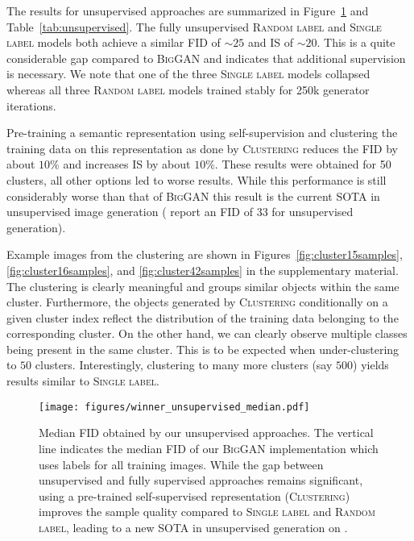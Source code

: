 \documentclass{article}
\newcommand{\tranC}{\textsc{Clustering}}
\newcommand{\slabels}{\textsc{Single label}}
\newcommand{\rlabels}{\textsc{Random label}}
\newcommand{\biggan}{\textsc{BigGAN}}
\begin{document}
The results for unsupervised approaches are summarized in Figure~\ref{fig:unsupervised} and Table~\ref{tab:unsupervised}. The fully unsupervised \rlabels{} and \slabels{} models both achieve a similar FID of $\sim25$ and IS of $\sim20$. This is a quite considerable gap compared to \biggan{} and indicates that additional supervision is necessary. We note that one of the three \slabels{} models collapsed whereas all three \rlabels{} models trained stably for 250k generator iterations.

Pre-training a semantic representation using self-supervision and clustering the training data on this representation as done by \tranC{} 
reduces the FID by about $10\%$ and increases IS by about $10\%$. These results were obtained for 50 clusters, all other options led to worse results. While this performance is still considerably worse than that of \biggan{} this result is the current SOTA in unsupervised image generation (\citet{chen2019self} report an FID of 33 for unsupervised generation).

Example images from the clustering are shown in Figures~\ref{fig:cluster15samples}, \ref{fig:cluster16samples}, and \ref{fig:cluster42samples} in the supplementary material. The clustering is clearly meaningful and groups similar objects within the same cluster. Furthermore, the objects generated by \tranC{} conditionally on a given cluster index reflect the distribution of the training data belonging to the corresponding cluster. On the other hand, we can clearly observe multiple classes being present in the same cluster. This is to be expected when under-clustering to $50$ clusters. Interestingly, clustering to many more clusters (say $500$) yields results similar to \slabels{}.
\begin{figure}[h]
\vspace{0.2cm}
\centering\texttt{[image: figures/winner\_unsupervised\_median.pdf]}
\caption{Median FID obtained by our unsupervised approaches. The vertical line indicates the median FID of our \biggan{} implementation which uses labels for all training images. While the gap between unsupervised and fully supervised approaches remains significant, using a pre-trained self-supervised representation (\tranC{}) improves the sample quality compared to \slabels{} and \rlabels{}, leading to a new SOTA in unsupervised generation on \imagenet{}.\label{fig:unsupervised}}
\end{figure}
\end{document}
